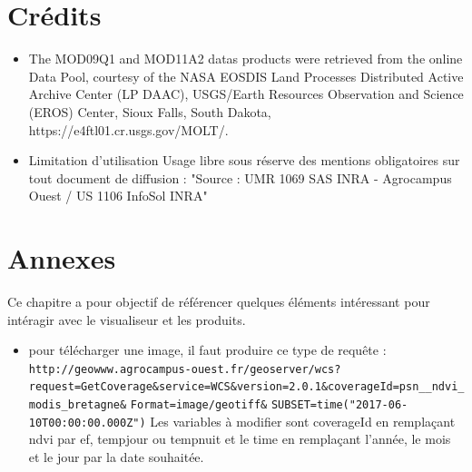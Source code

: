 \documentclass[10pt,a4paper]{article}
\begin{document}
\section{Crédits}
\begin{itemize}
\item The MOD09Q1 and MOD11A2 datas products were retrieved from the online Data Pool, courtesy of the NASA EOSDIS Land Processes Distributed Active Archive Center (LP DAAC), USGS/Earth Resources Observation and Science (EROS) Center, Sioux Falls, South Dakota, https://e4ftl01.cr.usgs.gov/MOLT/. 
\item Limitation d'utilisation
Usage libre sous réserve des mentions obligatoires sur tout document de diffusion : "Source : UMR 1069 SAS INRA - Agrocampus Ouest / US 1106 InfoSol INRA" 
\end{itemize}

\section{Annexes}

Ce chapitre a pour objectif de référencer quelques éléments intéressant pour intéragir avec le visualiseur et les produits.

\begin{itemize}
\item pour télécharger une image, il faut produire ce type de requête : \newline
\verb!http://geowww.agrocampus-ouest.fr/geoserver/wcs?!\newline\verb!request=GetCoverage&service=WCS&version=2.0.1&!\newline\verb!coverageId=psn__ndvi_modis_bretagne&!
\newline\verb!Format=image/geotiff&!
\newline\verb!SUBSET=time("2017-06-10T00:00:00.000Z")! \smallbreak 
Les variables à modifier sont coverageId en remplaçant ndvi par ef, tempjour ou tempnuit et le time en remplaçant l'année, le mois et le jour par la date souhaitée.
\end{itemize}
\end{document}

